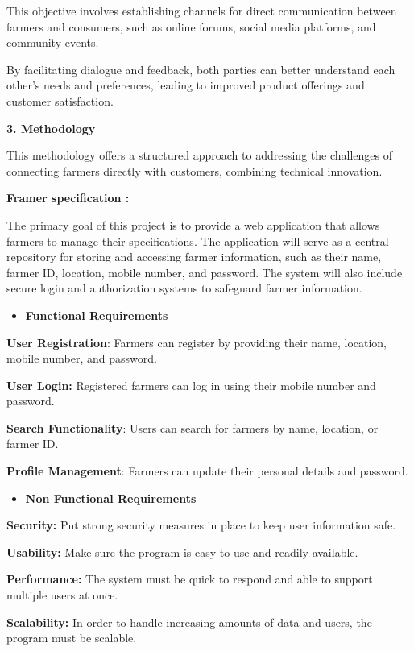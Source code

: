 \documentclass[
]{article}
\begin{document}
This objective involves establishing channels for direct communication
between farmers and consumers, such as online forums, social media
platforms, and community events.

By facilitating dialogue and feedback, both parties can better
understand each other's needs and preferences, leading to improved
product offerings and customer satisfaction.

\textbf{3. Methodology}

This methodology offers a structured approach to addressing the
challenges of connecting farmers directly with customers, combining
technical innovation.

\textbf{Framer specification :}

The primary goal of this project is to provide a web application that
allows farmers to manage their specifications. The application will
serve as a central repository for storing and accessing farmer
information, such as their name, farmer ID, location, mobile number, and
password. The system will also include secure login and authorization
systems to safeguard farmer information.

\begin{itemize}
\item
  \textbf{Functional Requirements}
\end{itemize}

\textbf{User Registration}: Farmers can register by providing their
name, location, mobile number, and password.

\textbf{User Login:} Registered farmers can log in using their mobile
number and password.

\textbf{Search Functionality}: Users can search for farmers by name,
location, or farmer ID.

\textbf{Profile Management}: Farmers can update their personal details
and password.

\begin{itemize}
\item
  \textbf{Non Functional Requirements}
\end{itemize}

\textbf{Security:} Put strong security measures in place to keep user
information safe.

\textbf{Usability:} Make sure the program is easy to use and readily
available.

\textbf{Performance:} The system must be quick to respond and able to
support multiple users at once.

\textbf{Scalability:} In order to handle increasing amounts of data and
users, the program must be scalable.
\end{document}
